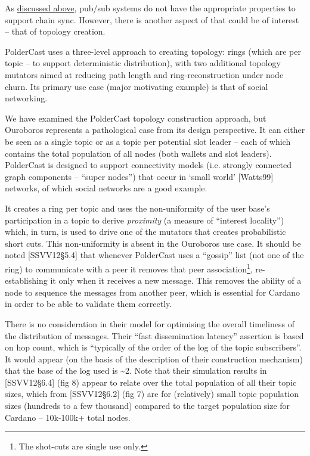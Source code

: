 \documentclass[11pt,a4paper]{article}
\begin{document}
As \protect\hyperlink{dpbtiakzv0oy}{{discussed above}}, pub/sub systems
do not have the appropriate properties to support chain sync. However,
there is another aspect of that could be of interest -- that of topology
creation.

PolderCast uses a three-level approach to creating topology: rings
(which are per topic -- to support deterministic distribution), with two
additional topology mutators aimed at reducing path length and
ring-reconstruction under node churn. Its primary use case (major
motivating example) is that of social networking.

We have examined the PolderCast topology construction approach, but
Ouroboros represents a pathological case from its design perspective. It
can either be seen as a single topic or as a topic per potential slot
leader -- each of which contains the total population of all nodes (both
wallets and slot leaders). PolderCast is designed to support
connectivity models (i.e. strongly connected graph components -- ``super
nodes'') that occur in `small world' {[}Watts99{]} networks, of which
social networks are a good example.

It creates a ring per topic and uses the non-uniformity of the user
base's participation in a topic to derive \emph{proximity} (a measure of
``interest locality'') which, in turn, is used to drive one of the
mutators that creates probabilistic short cuts. This non-uniformity is
absent in the Ouroboros use case. It should be noted {[}SSVV12§5.4{]}
that whenever PolderCast uses a ``gossip'' list (not one of the ring) to
communicate with a peer it removes that peer association\footnote{The
  shot-cuts are single use only.}, re-establishing it only when it
receives a new message. This removes the ability of a node to sequence
the messages from another peer, which is essential for Cardano in order
to be able to validate them correctly.

There is no consideration in their model for optimising the overall
timeliness of the distribution of messages. Their ``fast dissemination
latency'' assertion is based on hop count, which is ``typically of the
order of the log of the topic subscribers''. It would appear (on the
basis of the description of their construction mechanism) that the base
of the log used is \textasciitilde{}2. Note that their simulation
results in {[}SSVV12§6.4{]} (fig 8) appear to relate over the total
population of all their topic sizes, which from {[}SSVV12§6.2{]} (fig 7)
are for (relatively) small topic population sizes (hundreds to a few
thousand) compared to the target population size for Cardano --
10k-100k+ total nodes.
\end{document}
